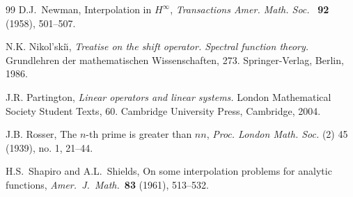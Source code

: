 \documentclass[11pt]{amsart}
\theoremstyle{definition}
\theoremstyle{remark}
\numberwithin{equation}{section}
\begin{document}
\begin{thebibliography}{99}
D.J.~Newman,
Interpolation in $H^\infty$,
{\em Transactions Amer. Math. Soc.} \ \textbf{92} (1958), 501--507.

N.K. Nikol'ski\u \i,  {\em  Treatise on the shift operator. Spectral function theory.}  Grundlehren der mathematischen Wissenschaften, 273. Springer-Verlag, Berlin, 1986.


J.R. Partington, {\em Linear operators and linear systems.} London Mathematical Society Student Texts, 60. Cambridge University Press, Cambridge, 2004.


 J.B. Rosser,  The $n$-th prime is greater than $n$$n$,
{\em Proc.   London Math. Soc.} (2) 45 (1939), no. 1, 21--44.

H.S.~Shapiro and A.L.~Shields,
On some interpolation problems for analytic functions,
{\em Amer.\ J.\ Math.}\ \textbf{83} (1961), 513--532.



\end{thebibliography}
\end{document}
